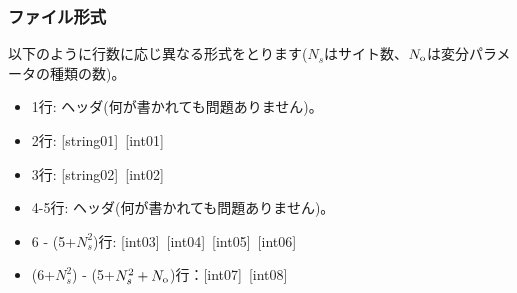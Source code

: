 \subsubsection{ファイル形式}
以下のように行数に応じ異なる形式をとります($N_s$はサイト数、$N_{\rm o}$は変分パラメータの種類の数)。
 \begin{itemize}
   \item  1行:  ヘッダ(何が書かれても問題ありません)。
   \item  2行:   [string01]~[int01]
   \item  3行:   [string02]~[int02]
   \item  4-5行:  ヘッダ(何が書かれても問題ありません)。
   \item  6 - (5+$N_s^2$)行: [int03]~[int04]~[int05]~[int06]
   \item  (6+$N_s^2$) - (5+$N_s^2+N_{\rm o}$)行：[int07]~[int08]
  \end{itemize}
